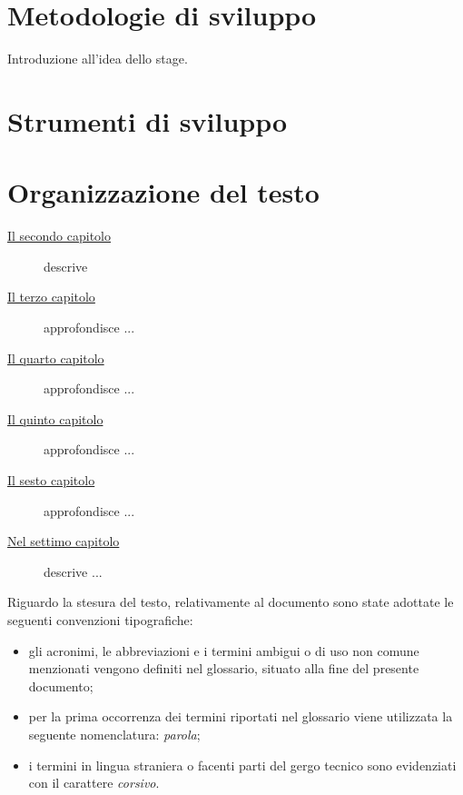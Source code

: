 \section{Metodologie di sviluppo}

Introduzione all'idea dello stage.

\section{Strumenti di sviluppo}

\section{Organizzazione del testo}

\begin{description}
    \item[{\hyperref[cap:processi-metodologie]{Il secondo capitolo}}] descrive 
    
    \item[{\hyperref[cap:descrizione-stage]{Il terzo capitolo}}] approfondisce ...
    
    \item[{\hyperref[cap:analisi-requisiti]{Il quarto capitolo}}] approfondisce ...
    
    \item[{\hyperref[cap:progettazione-codifica]{Il quinto capitolo}}] approfondisce ...
    
    \item[{\hyperref[cap:verifica-validazione]{Il sesto capitolo}}] approfondisce ...
    
    \item[{\hyperref[cap:conclusioni]{Nel settimo capitolo}}] descrive ...
\end{description}

Riguardo la stesura del testo, relativamente al documento sono state adottate le seguenti convenzioni tipografiche:
\begin{itemize}
	\item gli acronimi, le abbreviazioni e i termini ambigui o di uso non comune menzionati vengono definiti nel glossario, situato alla fine del presente documento;
	\item per la prima occorrenza dei termini riportati nel glossario viene utilizzata la seguente nomenclatura: \emph{parola}\glsfirstoccur;
	\item i termini in lingua straniera o facenti parti del gergo tecnico sono evidenziati con il carattere \emph{corsivo}.
\end{itemize}
